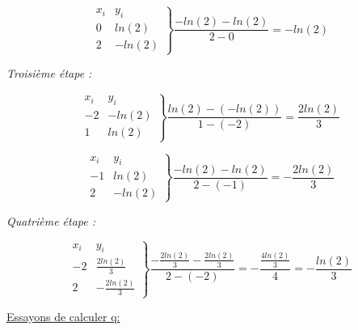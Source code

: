 \documentclass[12pt, letterpaper]{article}
\begin{document}
\begin{enumerate}
  \begin{equation*}
    \left.
    \begin{array}{ll}
      x_i & y_i \\
      0 & ln(2) \\
      2 & - ln(2) 
    \end{array}
    \right\}
    \frac{- ln(2) - ln(2)}{2 - 0} = - ln(2)
  \end{equation*}

  \textit{Troisième étape :}

  \begin{equation*}
    \left.
    \begin{array}{ll}
      x_i & y_i \\
      -2 & - ln(2) \\
      1 & ln(2) 
    \end{array}
    \right\}
    \frac{ln(2) - (-ln(2))}{1 - (-2)} = \frac{2ln(2)}{3}
  \end{equation*}

  \begin{equation*}
    \left.
    \begin{array}{ll}
      x_i & y_i \\
      -1 & ln(2) \\
      2 & - ln(2) 
    \end{array}
    \right\}
    \frac{- ln(2) - ln(2)}{2 - (-1)} = - \frac{2ln(2)}{3}
  \end{equation*}

  \textit{Quatrième étape :}

  \begin{equation*}
    \left.
    \begin{array}{ll}
      x_i & y_i \\
      -2 &  \frac{2ln(2)}{3} \\
      2 & - \frac{2ln(2)}{3}
    \end{array}
    \right\}
    \frac{- \frac{2ln(2)}{3} - \frac{2ln(2)}{3}}{2 - (-2)} = -
    \frac{\frac{4ln(2)}{3}}{4} = - \frac{ln(2)}{3}
  \end{equation*}

  \underline{Essayons de calculer q:}


\end{enumerate}
\end{document}
